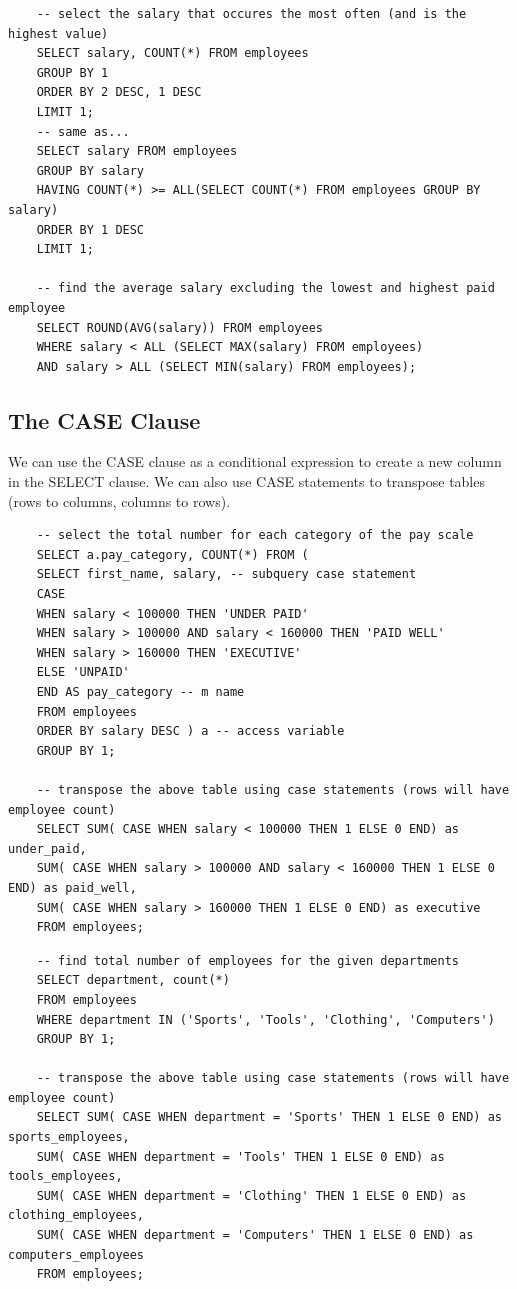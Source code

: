 \documentclass[11pt, a4paper]{article}
\begin{document}
\begin{spacing}{1.1}
\begin{lstlisting}
	-- select the salary that occures the most often (and is the highest value)
	SELECT salary, COUNT(*) FROM employees
	GROUP BY 1
	ORDER BY 2 DESC, 1 DESC
	LIMIT 1;
	-- same as...
	SELECT salary FROM employees
	GROUP BY salary
	HAVING COUNT(*) >= ALL(SELECT COUNT(*) FROM employees GROUP BY salary)
	ORDER BY 1 DESC
	LIMIT 1; 
	
	-- find the average salary excluding the lowest and highest paid employee
	SELECT ROUND(AVG(salary)) FROM employees
	WHERE salary < ALL (SELECT MAX(salary) FROM employees)
	AND salary > ALL (SELECT MIN(salary) FROM employees); \end{lstlisting} \vspace*{5mm}
	
	\subsection{The CASE Clause}
	We can use the CASE clause as a conditional expression to create a new column in the SELECT clause. We can also use CASE statements to transpose tables (rows to columns, columns to rows).
	\begin{lstlisting}
	-- select the total number for each category of the pay scale
	SELECT a.pay_category, COUNT(*) FROM (
	SELECT first_name, salary, -- subquery case statement
	CASE
	WHEN salary < 100000 THEN 'UNDER PAID'
	WHEN salary > 100000 AND salary < 160000 THEN 'PAID WELL'
	WHEN salary > 160000 THEN 'EXECUTIVE'
	ELSE 'UNPAID'
	END AS pay_category -- m name
	FROM employees 
	ORDER BY salary DESC ) a -- access variable
	GROUP BY 1; 
	
	-- transpose the above table using case statements (rows will have employee count)
	SELECT SUM( CASE WHEN salary < 100000 THEN 1 ELSE 0 END) as under_paid,
	SUM( CASE WHEN salary > 100000 AND salary < 160000 THEN 1 ELSE 0 END) as paid_well,
	SUM( CASE WHEN salary > 160000 THEN 1 ELSE 0 END) as executive
	FROM employees;	\end{lstlisting} \newpage
	\begin{lstlisting}
	-- find total number of employees for the given departments
	SELECT department, count(*)
	FROM employees 
	WHERE department IN ('Sports', 'Tools', 'Clothing', 'Computers')
	GROUP BY 1;
	
	-- transpose the above table using case statements (rows will have employee count)
	SELECT SUM( CASE WHEN department = 'Sports' THEN 1 ELSE 0 END) as sports_employees,
	SUM( CASE WHEN department = 'Tools' THEN 1 ELSE 0 END) as tools_employees,
	SUM( CASE WHEN department = 'Clothing' THEN 1 ELSE 0 END) as clothing_employees,
	SUM( CASE WHEN department = 'Computers' THEN 1 ELSE 0 END) as computers_employees
	FROM employees;
	

\end{lstlisting}
\end{spacing}
\end{document}
